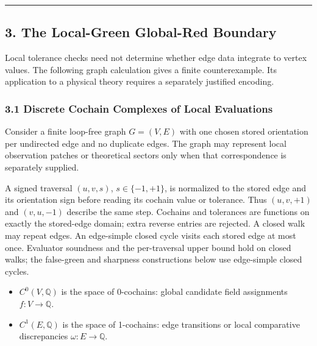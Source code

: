 \documentclass[
  10pt,
]{article}
\begin{document}
\begin{center}\rule{0.5\linewidth}{0.5pt}\end{center}

\subsection{3. The Local-Green Global-Red Boundary}\label{the-local-green-global-red-boundary}

Local tolerance checks need not determine whether edge data integrate to vertex values. The following graph calculation gives a finite counterexample. Its application to a physical theory requires a separately justified encoding.

\subsubsection{3.1 Discrete Cochain Complexes of Local Evaluations}\label{discrete-cochain-complexes-of-local-evaluations}

Consider a finite loop-free graph \hypertarget{math-E0062-0077}{}{\(G = (V, E)\)} with one chosen stored orientation per undirected edge and no duplicate edges. The graph may represent local observation patches or theoretical sectors only when that correspondence is separately supplied.

A signed traversal \hypertarget{math-E0063-0078}{}{\((u,v,s)\)}, \hypertarget{math-E0064-0079}{}{\(s\in\{-1,+1\}\)}, is normalized to the stored edge and its orientation sign before reading its cochain value or tolerance. Thus \hypertarget{math-E0065-0080}{}{\((u,v,+1)\)} and \hypertarget{math-E0066-0081}{}{\((v,u,-1)\)} describe the same step. Cochains and tolerances are functions on exactly the stored-edge domain; extra reverse entries are rejected. A closed walk may repeat edges. An edge-simple closed cycle visits each stored edge at most once. Evaluator soundness and the per-traversal upper bound hold on closed walks; the false-green and sharpness constructions below use edge-simple closed cycles.

\begin{itemize}
\item
  \hypertarget{math-E0067-0082}{}{\(C^0(V, \mathbb{Q})\)} is the space of 0-cochains: global candidate field assignments \hypertarget{math-E0068-0083}{}{\(f: V \to \mathbb{Q}\)}.
\item
  \hypertarget{math-E0069-0084}{}{\(C^1(E, \mathbb{Q})\)} is the space of 1-cochains: edge transitions or local comparative discrepancies \hypertarget{math-E0070-0085}{}{\(\omega: E \to \mathbb{Q}\)}.
\end{itemize}
\end{document}
